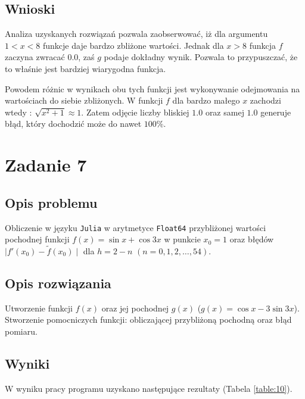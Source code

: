 \documentclass{classrep}
\begin{document}
	\subsection{Wnioski}
		Analiza uzyskanych rozwiązań pozwala zaobserwować, iż dla argumentu $1<x<8$ funkcje daje bardzo 
		zbliżone wartości. Jednak dla $x>8$ funkcja $f$ zaczyna zwracać $0.0$, zaś $g$ podaje dokładny wynik. 
		Pozwala to przypuszczać, że to właśnie jest bardziej wiarygodna funkcja.
		
		Powodem różnic w wynikach obu tych funkcji jest wykonywanie odejmowania na wartościach do siebie zbliżonych.
		W funkcji $f$ dla bardzo małego $x$ zachodzi wtedy :
		$\sqrt{x^{2}+1} \approx 1$. Zatem odjęcie liczby bliskiej $1.0$ oraz samej $1.0$ generuje błąd, który dochodzić może do nawet $100\%$.
\section{Zadanie 7}
	\subsection{Opis problemu}
		Obliczenie w języku \texttt{Julia} w arytmetyce \texttt{Float64} przybliżonej wartości pochodnej funkcji
		$f(x)=\sin{x}+\cos{3x}$ w punkcie $x_0=1$ oraz błędów $\mid f'(x_0)-\tilde{f}(x_0) \mid$ dla 
		$h=2-n$ $(n=0,1,2,\dots,54)$.
	\subsection{Opis rozwiązania}
		Utworzenie funkcji $f(x)$ oraz jej pochodnej $g(x)$ ($g(x)=\cos{x}-3\sin{3x}$). Stworzenie 
		pomocniczych funkcji: obliczającej przybliżoną pochodną oraz błąd pomiaru.
	\subsection{Wyniki}
		W wyniku pracy programu uzyskano następujące rezultaty (Tabela \ref{table:10}).
		
\end{document}
